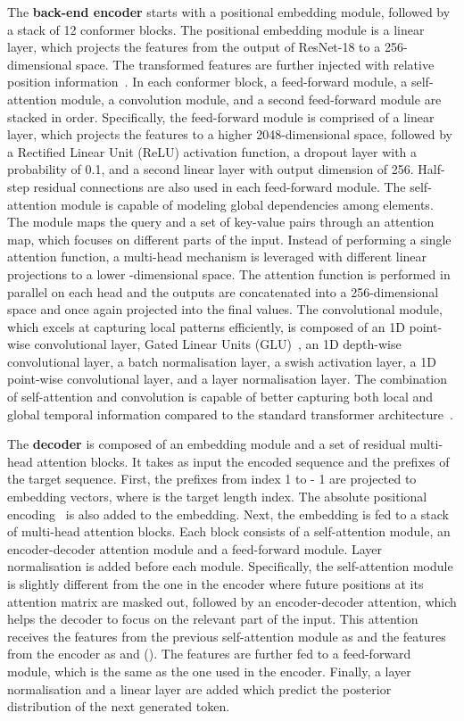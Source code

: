 \documentclass[twocolumn]{article}
\begin{document}
The \textbf{back-end encoder} starts with a positional embedding module, followed by a stack of 12 conformer blocks. The positional embedding module is a linear layer, which projects the features from the output of ResNet-18 to a 256-dimensional space. The transformed features are further injected with relative position information~\cite{dai2019transformer}. In each conformer block, a feed-forward module, a self-attention module, a convolution module, and a second feed-forward module are stacked in order. Specifically, the feed-forward module is comprised of a linear layer, which projects the features to a higher 2048-dimensional space, followed by a Rectified Linear Unit (ReLU) activation function, a dropout layer with a probability of 0.1, and a second linear layer with output dimension of 256. Half-step residual connections are also used in each feed-forward module. The self-attention module is capable of modeling global dependencies among elements. The module maps the query and a set of key-value pairs through an attention map, which focuses on different parts of the input. Instead of performing a single attention function, a multi-head mechanism is leveraged with different linear projections to a lower -dimensional space. The attention function is performed in parallel on each head and the outputs are concatenated into a 256-dimensional space and once again projected into the final values. The convolutional module, which excels at capturing local patterns efficiently, is composed of an 1D point-wise convolutional layer, Gated Linear Units (GLU)~\cite{dauphin2017language}, an 1D depth-wise convolutional layer, a batch normalisation layer, a swish activation layer, a 1D point-wise convolutional layer, and a layer normalisation layer. The combination of self-attention and convolution is capable of better capturing both local and global temporal information compared to the standard transformer architecture~\cite{gulati2020conformer}.

The \textbf{decoder} is composed of an embedding module and a set of residual multi-head attention blocks. It takes as input the encoded sequence and the prefixes of the target sequence. First, the prefixes from index 1 to  - 1 are projected to embedding vectors, where  is the target length index. The absolute positional encoding~\cite{vaswani2017attention} is also added to the embedding. Next, the embedding is fed to a stack of multi-head attention blocks. Each block consists of a self-attention module, an encoder-decoder attention module and a feed-forward module. Layer normalisation is added before each module. Specifically, the self-attention module is slightly different from the one in the encoder where future positions at its attention matrix are masked out, followed by an encoder-decoder attention, which helps the decoder to focus on the relevant part of the input. This attention receives the features from the previous self-attention module as  and the features from the encoder as  and  (). The features are further fed to a feed-forward module, which is the same as the one used in the encoder. Finally, a layer normalisation and a linear layer are added which predict the posterior distribution of the next generated token.
\end{document}
